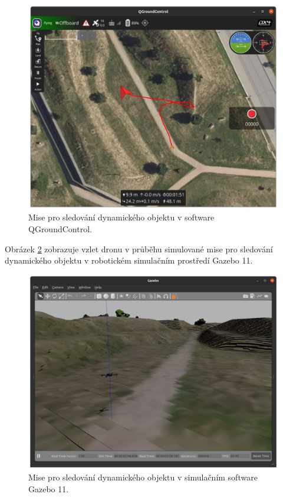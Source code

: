 \begin{figure}[!ht]
  \begin{center}
    \includegraphics[scale=0.40]{obrazky/MISESL1}
  \end{center}
  \caption[Mise pro sledování dynamického objektu v software QGroundControl]{Mise pro sledování dynamického objektu v software QGroundControl.}
  \label{fig:SIM3QGC}
\end{figure}

Obrázek \ref{fig:SIM3GAZ} zobrazuje vzlet dronu v průběhu simulované mise pro sledování dynamického objektu v robotickém simulačním prostředí Gazebo 11.

\begin{figure}[!ht]
  \begin{center}
    \includegraphics[scale=0.35]{obrazky/GAZSIMPLE.png}
  \end{center}
  \caption[Mise pro sledování dynamického objektu v simulačním software Gazebo 11]{Mise pro sledování dynamického objektu v simulačním software Gazebo 11.}
  \label{fig:SIM3GAZ}
\end{figure}


